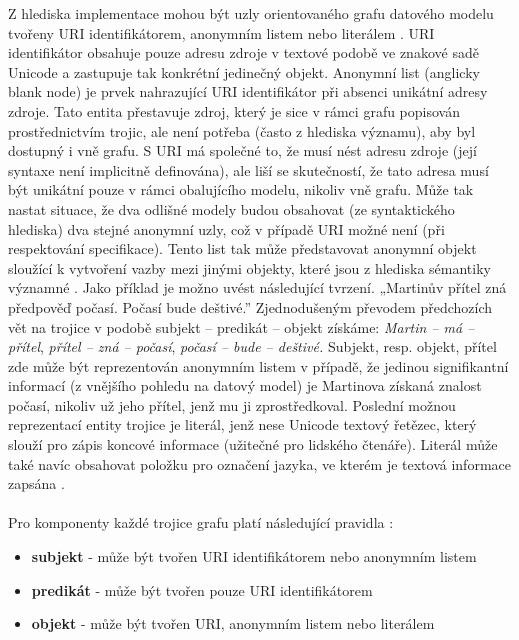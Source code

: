 \documentclass{projekt}
\begin{document}
Z hlediska implementace mohou být uzly orientovaného grafu datového modelu tvořeny URI identifikátorem, anonymním listem nebo literálem \cite{_6}. URI identifikátor obsahuje pouze adresu zdroje v textové podobě ve znakové sadě Unicode a zastupuje tak konkrétní jedinečný objekt. Anonymní list (anglicky blank node) je prvek nahrazující URI identifikátor při absenci unikátní adresy zdroje. Tato entita přestavuje zdroj, který je sice v rámci grafu popisován prostřednictvím trojic, ale není potřeba (často z hlediska významu), aby byl dostupný i vně grafu. S URI má společné to, že musí nést adresu zdroje (její syntaxe není implicitně definována), ale liší se skutečností, že tato adresa musí být unikátní pouze v rámci obalujícího modelu, nikoliv vně grafu. Může tak nastat situace, že dva odlišné modely budou obsahovat (ze syntaktického hlediska) dva stejné anonymní uzly, což v případě URI možné není (při respektování specifikace). Tento list tak může představovat anonymní objekt sloužící k vytvoření vazby mezi jinými objekty, které jsou z hlediska sémantiky významné \cite{_5}. Jako příklad je možno uvést následující tvrzení. „Martinův přítel zná předpověď počasí. Počasí bude deštivé.” Zjednodušeným převodem předchozích vět na trojice v podobě subjekt – predikát – objekt získáme: {\it Martin – má – přítel}, {\it přítel – zná – počasí},  {\it počasí – bude – deštivé.} 
Subjekt, resp. objekt, přítel zde může být reprezentován anonymním listem v případě, že jedinou signifikantní informací (z vnějšího pohledu na datový model) je Martinova získaná znalost počasí, nikoliv už jeho přítel, jenž mu ji zprostředkoval. 
Poslední možnou reprezentací entity trojice je literál, jenž nese Unicode textový řetězec, který slouží pro zápis koncové informace (užitečné pro lidského čtenáře). Literál může také navíc obsahovat položku pro označení jazyka, ve kterém je textová informace zapsána \cite{_34}. 
\\
\\
Pro komponenty každé trojice grafu platí následující pravidla \cite{_6}:

\begin {itemize}

\item \textbf{subjekt} - může být tvořen URI identifikátorem nebo anonymním listem
\item \textbf{predikát} - může být tvořen pouze URI identifikátorem
\item \textbf{objekt} - může být tvořen URI, anonymním listem nebo literálem

\end{itemize}
\end{document}
